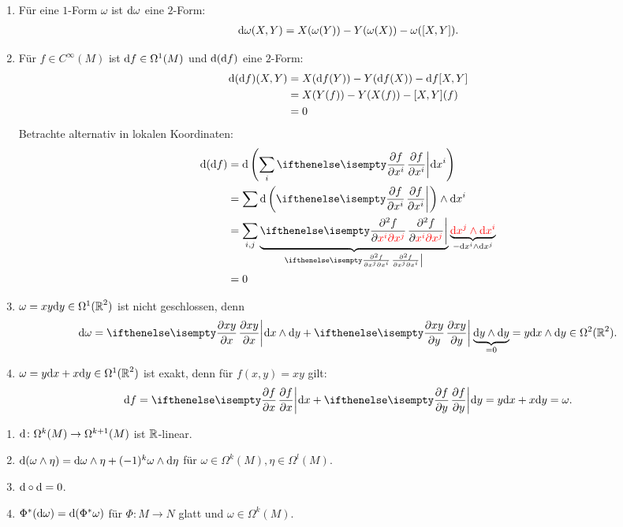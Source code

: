\begin{bsp}\begin{enumerate}[label=\arabic*),leftmargin=*]
\item
	Für eine $1$-Form $\omega$ ist $\mathrm{d} \omega$ eine $2$-Form:
	\begin{align*}
		\mathrm{d} \omega(X,Y) = X(\omega(Y)) - Y(\omega(X)) - \omega([X,Y]).
	\end{align*}
\item
	Für $f \in C^{\infty}(M)$ ist $\mathrm{d} f \in \Omega^1(M)$ und $\mathrm{d} (\mathrm{d} f)$ eine $2$-Form:
	\begin{align*}
		\mathrm{d}(\mathrm{d} f) (X,Y) & = X(\mathrm{d} f(Y)) - Y(\mathrm{d} f(X)) - \mathrm{d} f [X,Y]\\
		& = X(Y(f)) - Y(X(f)) -[X,Y](f)\\
		& = 0
	\end{align*}
	Betrachte alternativ in lokalen Koordinaten:
	\begin{align*}
		\dop(\dop f) & = \dop\left(\sum_i \pdifffrac{f}{x^i}\dop x^i\right)\\
		& = \sum \dop \left(\pdifffrac{f}{x^i}\right) \wedge \dop x^i\\
		& = \sum_{i,j} \underbrace{\pdifffrac{^2 f}{\textcolor{red}{x^i \partial x^j}}}_{\pdifffrac{^2f}{x^j \partial x^{i}}} \underbrace{\textcolor{red}{\dop x^j \wedge \dop x^i}}_{- \dop x^i \wedge \dop x^{j}}\\
		& = 0
	\end{align*}
\item
	$\omega = xy \mathrm{d} y \in \Omega^1(\operatorname{\mathbb{R}}^2)$ ist nicht geschlossen, denn
	\begin{align*}
		\dop \omega = \pdifffrac{xy}{x} \dop x \wedge \dop y + \pdifffrac{xy}{y}\underbrace{ \dop y \wedge \dop y}_{=0} = y \dop x \wedge \dop y \in \Omega^2(\R^2).
	\end{align*}
\item
	$\omega = y \mathrm{d} x + x \mathrm{d} y \in \Omega^1(\operatorname{\mathbb{R}}^2)$ ist exakt, denn für $f(x,y) = xy$ gilt:
	\begin{align*}
		\dop f = \pdifffrac{f}{x}\dop x + \pdifffrac{f}{y}\dop y = y \dop x + x \dop y = \omega.
	\end{align*}
\end{enumerate}\end{bsp}

\begin{Lemma}
  \begin{enumerate}[label=(\roman*)]
  \item $\mathrm{d} \colon \Omega^k(M) \to \Omega^{k+1}(M)$ ist $\operatorname{\mathbb{R}}$-linear.
  \item $\mathrm{d}(\omega \wedge \eta) = \mathrm{d} \omega \wedge \eta + (-1)^k \omega \wedge \mathrm{d} \eta$ für $\omega \in \Omega^k(M), \eta \in \Omega^l(M)$.
  \item $\mathrm{d} \circ \mathrm{d} = 0$.
  \item $\Phi^*(\mathrm{d} \omega) = \mathrm{d} (\Phi^{*}\omega)$ für $\Phi \colon M \to N$ glatt und $\omega \in \Omega^k(M)$.
  \end{enumerate}
\end{Lemma}

